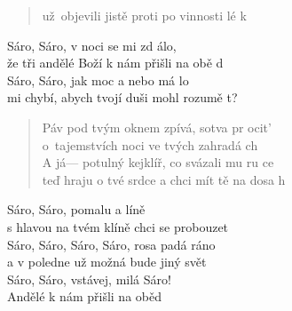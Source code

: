 \begin{song}{}
\begin{verse}
   už~objevili jistě proti po vinnosti lé k
\end{verse}
\begin{refren}
   Sáro, Sáro, v noci se mi zd álo, \\
   že tři andělé Boží k nám přišli na obě d \\
   Sáro, Sáro, jak moc a nebo má lo \\
   mi chybí, abych tvojí duši mohl rozumě t?
\end{refren}
\begin{verse}
   Páv pod tvým oknem zpívá, sotva pr ocit' \\
   o~tajemstvích noci ve tvých zahradá ch \\
   A já--- potulný kejklíř, co svázali mu ru ce \\
   teď hraju o tvé srdce a chci mít tě na dosa h
\end{verse}
\begin{refren}
   Sáro, Sáro, pomalu a líně \\
   s hlavou na tvém klíně chci se probouzet \\
   Sáro, Sáro, Sáro, Sáro, rosa padá ráno \\
   a v poledne už možná bude jiný svět \\
   Sáro, Sáro, vstávej, milá Sáro! \\
   Andělé k nám přišli na oběd
\end{refren}
\end{song}
\pagebreak
